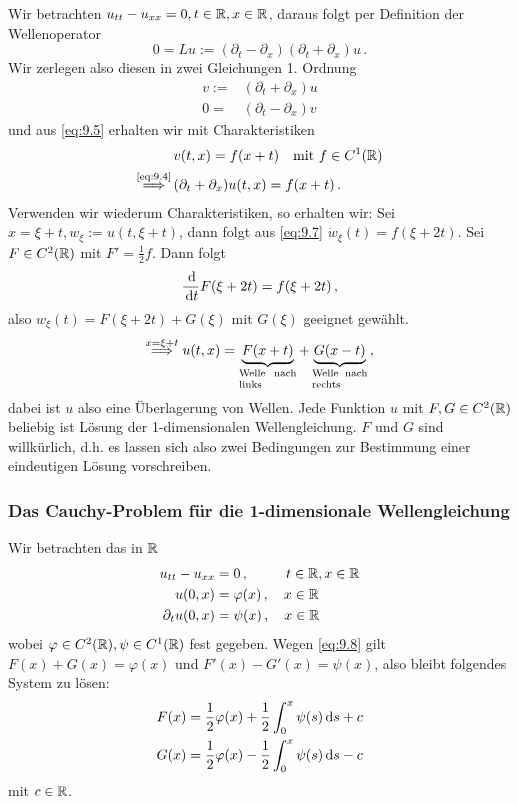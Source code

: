 Wir betrachten $u_{tt} - u_{xx} = 0, t \in \mathbb{R}, x\in \mathbb{R}$, daraus folgt per Definition der Wellenoperator
\[
	0 = Lu := (\partial_t -\partial_x)(\partial_t + \partial_x) u \, .
\]
Wir zerlegen also diesen in zwei Gleichungen 1. Ordnung
\begin{align}
	\label{eq:9.4}
	v :=& (\partial_t + \partial_x) u \\
	\label{eq:9.5}
	0 = & (\partial_t-\partial_x) v 
\end{align}
und aus \eqref{eq:9.5} erhalten wir mit Charakteristiken
\begin{align}\label{eq:9.6}
	 & v(t,x) = f(x+t) \quad \text{mit } f \in C^1 (\mathbb{R}) \\
	 \label{eq:9.7}
	\stackrel{\scriptsize\eqref{eq:9.4}}{\Longrightarrow} \, & (\partial_t +\partial_x) u(t,x) = f(x+t)  \, .
\end{align}
Verwenden wir wiederum Charakteristiken, so erhalten wir: Sei $x = \xi + t, w_\xi := u(t,\xi+t)$, dann folgt aus \eqref{eq:9.7} $\dot w_\xi (t) = f(\xi + 2t)$. Sei $F \in C^2(\mathbb{R})$ mit $F' = \frac 1 2 f$. Dann folgt
\[
	\frac{\,\mathrm{d}}{\,\mathrm{d} t} F(\xi + 2t) = f(\xi + 2t) \, ,
\] 
also $w_\xi (t) = F(\xi + 2t) + G(\xi)$ mit $G(\xi)$ geeignet gewählt.
\begin{align}\label{eq:9.8}
	\stackrel{x=\xi+t}\Ra u (t,x) = \underbrace{F(x+t)}_{\parbox{1.45cm}{\scriptsize Welle nach links}} + \underbrace{G(x-t)}_{\parbox{1.4cm}{\scriptsize Welle nach rechts}} \, , 
\end{align}
dabei ist $u$ also eine Überlagerung von Wellen. Jede Funktion $u$ mit $F,G \in C^2 (\mathbb{R})$ beliebig ist Lösung der 1-dimensionalen Wellengleichung. $F$ und $G$ sind willkürlich, d.h. es lassen sich also zwei Bedingungen zur Bestimmung einer eindeutigen Lösung vorschreiben.

\subsubsection{Das Cauchy-Problem für die 1-dimensionale Wellengleichung}

Wir betrachten das  in $\mathbb{R}$
\begin{align*}
	u_{tt} - u_{xx} &= 0 \, , \quad \qquad \! \! t \in \mathbb{R}, x \in \mathbb{R} \\
	u(0,x) & = \varphi (x) \, , \quad x \in \mathbb{R} \\
	\partial_t u(0,x)& = \psi(x) \, , \quad x \in \mathbb{R}
\end{align*}
wobei $\varphi \in C^2(\mathbb{R}), \psi \in C^1(\mathbb{R})$ fest gegeben. Wegen \eqref{eq:9.8} gilt $F(x) + G(x) = \varphi(x)$ und $F'(x) -G'(x) = \psi(x)$, also bleibt folgendes System zu lösen:
\begin{align*}
	F(x) & = \frac 1 2 \varphi (x) + \frac 1 2 \int_0^x \psi (s) \,\mathrm{d} s + c \\
	G(x) & = \frac 1 2 \varphi (x) - \frac 1 2 \int_0^x \psi(s) \,\mathrm{d} s - c
\end{align*}
mit $c \in \mathbb{R}$.

